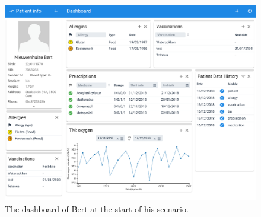    \begin{figure}[h!]
        \centering
        \includegraphics[width=1\textwidth]{chapters/appendix/test_bert}
        \caption{The dashboard of Bert at the start of his scenario.}
    \end{figure}